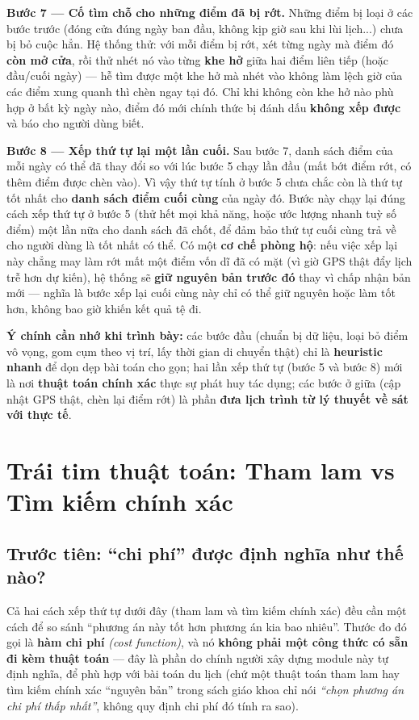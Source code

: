 \documentclass[12pt,a4paper]{article}
\newcommand{\en}[1]{\textit{(#1)}}            %
\begin{document}
\textbf{Bước 7 --- Cố tìm chỗ cho những điểm đã bị rớt.} Những điểm bị loại ở
các bước trước (đóng cửa đúng ngày ban đầu, không kịp giờ sau khi lùi lịch...)
chưa bị bỏ cuộc hẳn. Hệ thống thử: với mỗi điểm bị rớt, xét từng ngày mà điểm
đó \textbf{còn mở cửa}, rồi thử nhét nó vào từng \textbf{khe hở} giữa hai điểm
liên tiếp (hoặc đầu/cuối ngày) --- hễ tìm được một khe hở mà nhét vào không làm
lệch giờ của các điểm xung quanh thì chèn ngay tại đó. Chỉ khi không còn khe hở
nào phù hợp ở bất kỳ ngày nào, điểm đó mới chính thức bị đánh dấu \textbf{không
xếp được} và báo cho người dùng biết.

\textbf{Bước 8 --- Xếp thứ tự lại một lần cuối.} Sau bước 7, danh sách điểm của
mỗi ngày có thể đã thay đổi so với lúc bước 5 chạy lần đầu (mất bớt điểm rớt,
có thêm điểm được chèn vào). Vì vậy thứ tự tính ở bước 5 chưa chắc còn là thứ
tự tốt nhất cho \textbf{danh sách điểm cuối cùng} của ngày đó. Bước này chạy
lại đúng cách xếp thứ tự ở bước 5 (thử hết mọi khả năng, hoặc ước lượng nhanh
tuỳ số điểm) một lần nữa cho danh sách đã chốt, để đảm bảo thứ tự cuối cùng
trả về cho người dùng là tốt nhất có thể. Có một \textbf{cơ chế phòng hộ}: nếu
việc xếp lại này chẳng may làm rớt mất một điểm vốn dĩ đã có mặt (vì giờ GPS
thật đẩy lịch trễ hơn dự kiến), hệ thống sẽ \textbf{giữ nguyên bản trước đó}
thay vì chấp nhận bản mới --- nghĩa là bước xếp lại cuối cùng này chỉ có thể
giữ nguyên hoặc làm tốt hơn, không bao giờ khiến kết quả tệ đi.

\textbf{Ý chính cần nhớ khi trình bày:} các bước đầu (chuẩn bị dữ liệu, loại bỏ
điểm vô vọng, gom cụm theo vị trí, lấy thời gian di chuyển thật) chỉ là
\textbf{heuristic nhanh} để dọn dẹp bài toán cho gọn; hai lần xếp thứ tự (bước
5 và bước 8) mới là nơi \textbf{thuật toán chính xác} thực sự phát huy tác
dụng; các bước ở giữa (cập nhật GPS thật, chèn lại điểm rớt) là phần
\textbf{đưa lịch trình từ lý thuyết về sát với thực tế}.

\section{Trái tim thuật toán: Tham lam vs Tìm kiếm chính xác}

\subsection{Trước tiên: ``chi phí'' được định nghĩa như thế nào?}

Cả hai cách xếp thứ tự dưới đây (tham lam và tìm kiếm chính xác) đều cần một
cách để so sánh ``phương án này tốt hơn phương án kia bao nhiêu''. Thước đo đó
gọi là \textbf{hàm chi phí} \en{cost function}, và nó \textbf{không phải một
công thức có sẵn đi kèm thuật toán} --- đây là phần do chính người xây dựng
module này tự định nghĩa, để phù hợp với bài toán du lịch (chứ một thuật toán
tham lam hay tìm kiếm chính xác ``nguyên bản'' trong sách giáo khoa chỉ nói
\textit{``chọn phương án chi phí thấp nhất''}, không quy định chi phí đó tính
ra sao).
\end{document}
